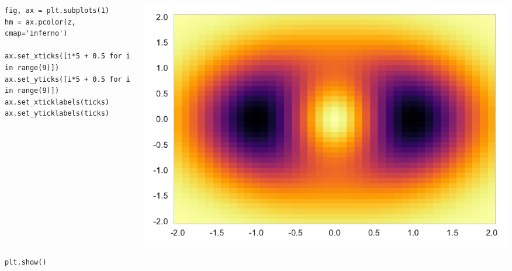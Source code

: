 \documentclass{beamer}
\begin{document}
\begin{frame}[fragile]
\tiny{
\begin{columns}
\begin{column}{0.45\textwidth}
\begin{verbatim}
fig, ax = plt.subplots(1)
hm = ax.pcolor(z, cmap='inferno')

ax.set_xticks([i*5 + 0.5 for i in range(9)])
ax.set_yticks([i*5 + 0.5 for i in range(9)])
ax.set_xticklabels(ticks)
ax.set_yticklabels(ticks)












plt.show()
\end{verbatim}
\end{column}
\begin{column}{0.55\textwidth}
\includegraphics[width=\textwidth]{heatmap_3.pdf}
\end{column}
\end{columns}
}
\end{frame}
\end{document}
